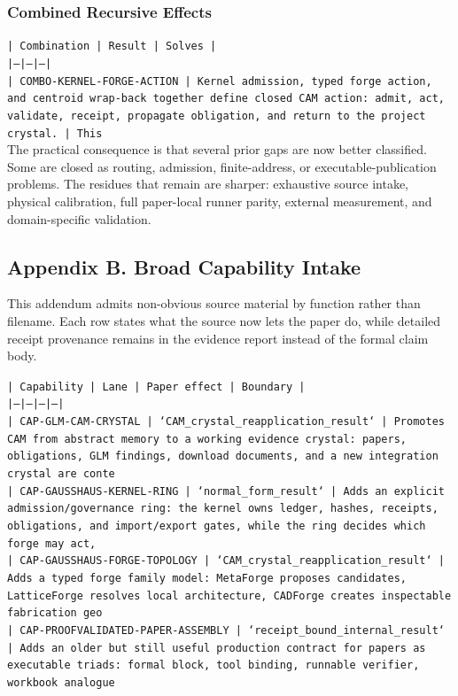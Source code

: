 \documentclass[11pt]{article}
\begin{document}
\subsubsection*{Combined Recursive Effects}

\noindent\texttt{| Combination | Result | Solves |}\\
\noindent\texttt{|---|---|---|}\\
\noindent\texttt{| COMBO-KERNEL-FORGE-ACTION | Kernel admission, typed forge action, and centroid wrap-back together define closed CAM action: admit, act, validate, receipt, propagate obligation, and return to the project crystal. | This}\\

The practical consequence is that several prior gaps are now better classified. Some are closed as routing, admission, finite-address, or executable-publication problems. The residues that remain are sharper: exhaustive source intake, physical calibration, full paper-local runner parity, external measurement, and domain-specific validation.

\subsection*{Appendix B. Broad Capability Intake}

This addendum admits non-obvious source material by function rather than filename. Each row states what the source now lets the paper do, while detailed receipt provenance remains in the evidence report instead of the formal claim body.

\noindent\texttt{| Capability | Lane | Paper effect | Boundary |}\\
\noindent\texttt{|---|---|---|---|}\\
\noindent\texttt{| CAP-GLM-CAM-CRYSTAL | `CAM\_crystal\_reapplication\_result` | Promotes CAM from abstract memory to a working evidence crystal: papers, obligations, GLM findings, download documents, and a new integration crystal are conte}\\
\noindent\texttt{| CAP-GAUSSHAUS-KERNEL-RING | `normal\_form\_result` | Adds an explicit admission/governance ring: the kernel owns ledger, hashes, receipts, obligations, and import/export gates, while the ring decides which forge may act,}\\
\noindent\texttt{| CAP-GAUSSHAUS-FORGE-TOPOLOGY | `CAM\_crystal\_reapplication\_result` | Adds a typed forge family model: MetaForge proposes candidates, LatticeForge resolves local architecture, CADForge creates inspectable fabrication geo}\\
\noindent\texttt{| CAP-PROOFVALIDATED-PAPER-ASSEMBLY | `receipt\_bound\_internal\_result` | Adds an older but still useful production contract for papers as executable triads: formal block, tool binding, runnable verifier, workbook analogue}\\
\end{document}
